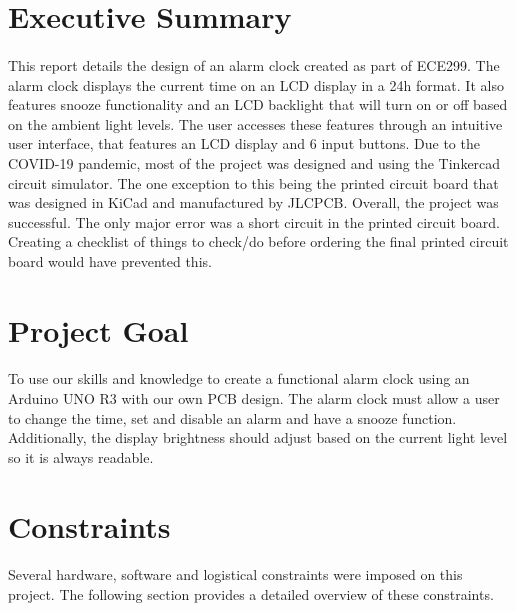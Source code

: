 \documentclass{article}
\begin{document}
\newpage


\section*{Executive Summary}
\paragraph{}
This report details the design of an alarm clock created as part of ECE299. The alarm clock displays the current time on an LCD display in a 24h format. It also features snooze functionality and an LCD backlight that will turn on or off based on the ambient light levels. The user accesses these features through an intuitive user interface, that features an LCD display and 6 input buttons. Due to the COVID-19 pandemic, most of the project was designed and using the Tinkercad circuit simulator. The one exception to this being the printed circuit board that was designed in KiCad and manufactured by JLCPCB. Overall, the project was successful. The only major error was a short circuit in the printed circuit board.  Creating a checklist of things to check/do before ordering the final printed circuit board would have prevented this.


\newpage
\tableofcontents
\newpage
\listoftables
{}
\newpage
\listoffigures
{}
\newpage

\section{Project Goal} %
\paragraph{}
To use our skills and knowledge to create a functional alarm clock using an Arduino UNO R3 with our own PCB design. The alarm clock must allow a user to change the time, set and disable an alarm and have a snooze function. Additionally, the display brightness should adjust based on the current light level so it is always readable.

\section{Constraints} %
\paragraph{}
Several hardware, software and logistical constraints were imposed on this project. The following section provides a detailed overview of these constraints.
\end{document}
